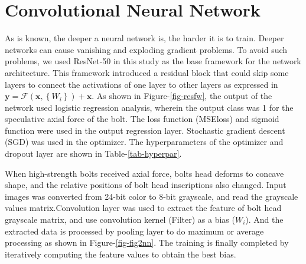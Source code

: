 \documentclass{proc-a4}
\begin{document}
\section{Convolutional Neural Network}

As is known, the deeper a neural network is, the harder it is to train. Deeper networks can cause vanishing and exploding gradient problems. To avoid such problems,  we used ResNet-50 in this study \citep{resnet2016} as the base framework for the network architecture. This framework introduced a residual block that could skip some layers to connect the activations of one layer to other layers as expressed in $\mathbf{y}=\mathcal{F}\left(\mathbf{x},\left\{W_i\right\}\right)+\mathbf{x}$.  As shown in Figure-\ref{fig-resfw}, the output of the network used logistic regression analysis, wherein the output class was 1 for the speculative axial force of the bolt. The loss function (MSEloss) and sigmoid function were used in the output regression layer.  Stochastic gradient descent (SGD) was used in the optimizer. The hyperparameters of the optimizer and dropout layer are shown in Table-\ref{tab-hyperpar}.

When high-strength bolts received axial force, bolts head deforms to concave shape, and the relative positions of bolt head inscriptions also changed. Input images was converted from 24-bit color to 8-bit grayscale, and read the grayscale values matrix.Convolution layer was used to extract the feature of bolt head grayscale matrix, and use convolution kernel (Filter) as a bias ($W_i$). And the extracted data is processed by pooling layer to do maximum or average processing as shown in Figure-\ref{fig-fig2nn}. The training is finally completed by iteratively computing the feature values to obtain the best bias.

\end{document}

